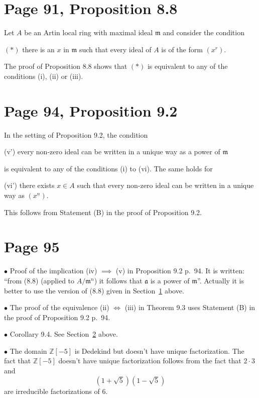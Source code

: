\documentclass[parskip=half]{scrartcl}%
\newcommand{\mf}{\mathfrak}
\newcommand{\bu}{\bullet}
\begin{document}
\section{Page 91, Proposition 8.8}\label{88}%

Let $A$ be an Artin local ring with maximal ideal $\mf m$ and consider the condition

$(*)$ there is an $x$ in $\mf m$ such that every ideal of $A$ is of the form $(x^r)$. 

The proof of Proposition 8.8 shows that $(*)$ is equivalent to any of the conditions (i), (ii) or (iii).

\section{Page 94, Proposition 9.2}\label{92}%

In the setting of Proposition 9.2, the condition

(v') every non-zero ideal can be written in a unique way as a power of $\mf m$

 is equivalent to any of the conditions (i) to (vi). The same holds for

(vi') there exists $x\in A$ such that every non-zero ideal can be written in a unique way as $(x^n)$.

This follows from Statement (B) in the proof of Proposition 9.2.

\section{Page 95}%

$\bu$ Proof of the implication (iv) $\implies$ (v) in Proposition 9.2 p.~94. It is written: ``from (8.8) (applied to $A/\mf m^n$) it follows that $\mf a$ is a power of $\mf m$''. Actually it is better to use the version of (8.8) given in Section~\ref{88} above.

$\bu$ The proof of the equivalence (ii) $\iff$ (iii) in Theorem 9.3 uses Statement (B) in the proof of Proposition 9.2 p.~94.

$\bu$ Corollary 9.4. See Section~\ref{92} above.

$\bu$ The domain $\mathbb Z[-5]$ is Dedekind but doesn't have unique factorization. %
The fact that $\mathbb Z[-5]$ doesn't have unique factorization follows from the fact that $2\cdot3$ and $$\left(1+\sqrt5\right)\left(1-\sqrt5\right)$$ are irreducible factorizations of $6$.%
\end{document}
